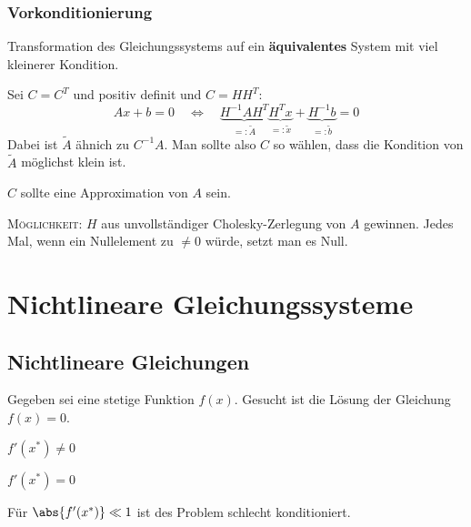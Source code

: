 		\subsubsection{Vorkonditionierung}
			Transformation des Gleichungssystems auf ein \textbf{äquivalentes} System mit viel kleinerer Kondition.

			Sei $C=C^T$ und positiv definit und $C=H H^T$:
			\[
				Ax + b = 0 \quad\Leftrightarrow\quad \underbrace{H^{-1}AH^T}_{=: \tilde A} \underbrace{H^Tx}_{=: \tilde x} + \underbrace{H^{-1}b}_{=: \tilde b} = 0\]
			Dabei ist $\tilde A$ ähnich zu $C^{-1}A$. Man sollte also $C$ so wählen, dass die Kondition von $\tilde A$ möglichst klein ist. \\

			\begin{folgerung}
				$C$ sollte eine Approximation von $A$ sein.
			\end{folgerung}

			\textsc{Möglichkeit:} $H$ aus unvollständiger Cholesky-Zerlegung von $A$ gewinnen. Jedes Mal, wenn ein Nullelement zu $\neq 0$ würde, setzt man es Null.

\section{Nichtlineare Gleichungssysteme}
	\subsection{Nichtlineare Gleichungen}
		Gegeben sei eine stetige Funktion $f(x)$. Gesucht ist die Lösung der Gleichung $f(x)=0$.
		\begin{tightenumerate}
			\item $f'(x^*)\not= 0$
			\item $f'(x^*) = 0 $
		\end{tightenumerate}
		Für $\abs{f'(x^*)} \ll 1$ ist des Problem schlecht konditioniert.


